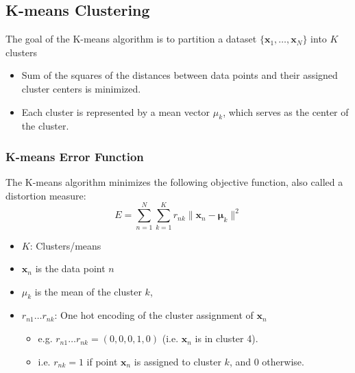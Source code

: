 \subsection{K-means Clustering}
\begin{definition}
    The goal of the K-means algorithm is to partition a dataset $\{\mathbf{x}_1,\ldots,\mathbf{x}_N\}$ into \( K \) clusters
    \begin{itemize}
        \item Sum of the squares of the distances between data points and their assigned cluster centers is minimized. 
        \item Each cluster is represented by a mean vector \( \mu_k \), which serves as the center of the cluster.
    \end{itemize}
\end{definition}

\subsubsection{K-means Error Function}
\begin{definition}
    The K-means algorithm minimizes the following objective function, also called a distortion measure:
    \begin{equation}
        E = \sum_{n=1}^{N} \sum_{k=1}^{K} r_{nk} \| \mathbf{x}_n - \mathbf{\mu}_k \|^2
    \end{equation}
    \begin{itemize}
        \item $K$: Clusters/means
        \item \( \mathbf{x}_n \) is the data point \( n \)
        \item \( \mu_k \) is the mean of the cluster \( k \),
        \item $r_{n1}\ldots r_{nk}$: One hot encoding of the cluster assignment of $\mathbf{x}_n$
        \begin{itemize}
            \item e.g. $r_{n1}\ldots r_{nk} = (0,0,0,1,0)$ (i.e. $\mathbf{x}_n$ is in cluster 4).
            \item i.e.  \( r_{nk} = 1 \) if point \( \mathbf{x}_n \) is assigned to cluster \( k \), and 0 otherwise.
        \end{itemize}
    \end{itemize}
\end{definition}
    
